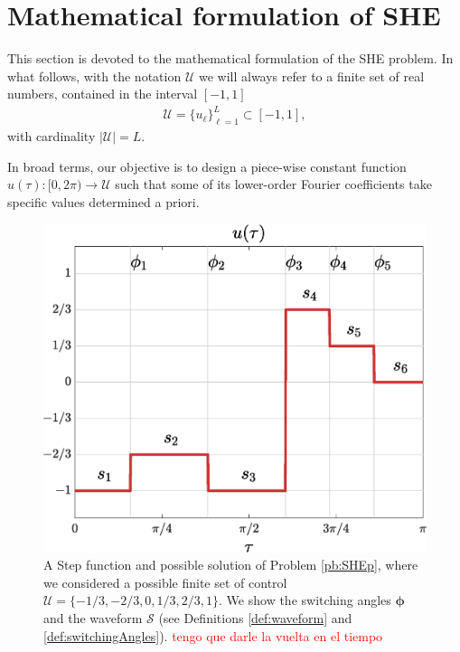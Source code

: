 \section{Mathematical formulation of SHE}\label{Section2}

This section is devoted to the mathematical formulation of the SHE problem. In what follows, with the notation $\mathcal U$ we will always refer to a finite set of real numbers, contained in the interval $[-1,1]$
\begin{align}\label{eq:Udef}
	\mathcal U = \{u_\ell\}_{\ell=1}^L\subset [-1,1],
\end{align}
with cardinality $|\mathcal U| = L$. 

In broad terms, our objective is to design a piece-wise constant function $u(\tau):[0,2\pi)\to\mathcal U$ such that some of its lower-order Fourier coefficients take specific values determined a priori. 

 
\begin{figure}
	\centering
	\includegraphics[scale=0.35]{img/fig01.eps} 
	\caption{A Step function and possible solution of Problem \ref{pb:SHEp}, where we considered a possible finite set of control $\mathcal{U} = \{-1/3, -2/3, 0, 1/3, 2/3, 1\}$. We show the switching angles $\bm{\phi}$ and the waveform $\mathcal{S}$ (see Definitions \ref{def:waveform} and \ref{def:switchingAngles}). \textcolor{red}{tengo que darle la vuelta en el tiempo}}\label{fig:exampleSHE}
\end{figure}

